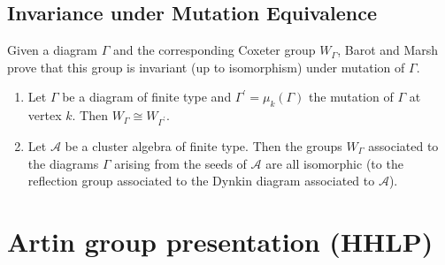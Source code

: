 \documentclass{beamer}
\begin{document}
\subsection{Invariance under Mutation Equivalence}

\begin{frame}
Given a diagram $\Gamma$ and the corresponding Coxeter group $W_{\Gamma}$, Barot and Marsh prove that this group is invariant (up to isomorphism) under mutation of $\Gamma$.

\begin{theorem}
\begin{enumerate}
\item Let $\Gamma$ be a diagram of finite type and $\Gamma^{\prime} = \mu_k(\Gamma)$ the mutation of $\Gamma$ at vertex $k$. Then $W_{\Gamma} \cong W_{\Gamma^{\prime}}$.
\item Let $\mathscr{A}$ be a cluster algebra of finite type. Then the groups $W_{\Gamma}$ associated to the diagrams $\Gamma$ arising from the seeds of $\mathscr{A}$ are all isomorphic (to the reflection group associated to the Dynkin diagram associated to $\mathscr{A}$).
\end{enumerate}
\end{theorem}
\end{frame}


\section{Artin group presentation (HHLP)}
\end{document}
